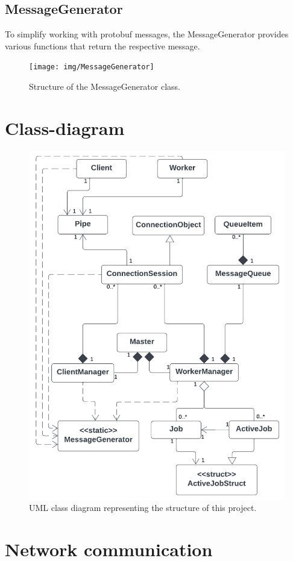 \documentclass[12pt, letterpaper]{article}
\begin{document}
\subsection{MessageGenerator}

To simplify working with protobuf messages, the MessageGenerator provides various functions that return the respective message. 

\begin{figure}[h]
	\centering
	\texttt{[image: img/MessageGenerator]}
	\caption{Structure of the MessageGenerator class.}
	\label{fig:classes_MessageGenerator}
\end{figure}

\pagebreak
\section{Class-diagram}

\begin{figure}[hp]
	\centering
	\includegraphics[width=0.75\linewidth]{img/ClassDiagram}
	\caption{UML class diagram representing the structure of this project.}
	\label{fig:classDiagram}
\end{figure}

\section{Network communication}
\end{document}
